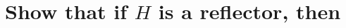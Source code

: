 \documentclass[11pt,a4paper]{article}
\begin{document}
\begin{titlepage}
    \maketitle
\end{titlepage}
%
\newpage
\setcounter{section}{1}
\section{Show that if $H$ is a reflector, then}
\end{document}
